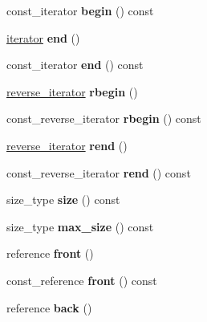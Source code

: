 \begin{DoxyCompactItemize}
\item 
\mbox{\label{classlist_ac8d43ad5c08a208998c872980c7d689d}} 
const\+\_\+iterator {\bfseries begin} () const
\item 
\mbox{\label{classlist_ac9f737cf32b7ee246d5a3af3a4762a2f}} 
\hyperlink{structiterator}{iterator} {\bfseries end} ()
\item 
\mbox{\label{classlist_a815c9d6fe25e78ee1381f70ecc1dc7cd}} 
const\+\_\+iterator {\bfseries end} () const
\item 
\mbox{\label{classlist_ad73fa8a409641c4f8e2d55340b643f85}} 
\hyperlink{classreverse__iterator}{reverse\+\_\+iterator} {\bfseries rbegin} ()
\item 
\mbox{\label{classlist_ab822d5b21ad59f49a9baa2e9834c5cfa}} 
const\+\_\+reverse\+\_\+iterator {\bfseries rbegin} () const
\item 
\mbox{\label{classlist_a2e5f98d6bfb90f56e3b36c1ed43f8a3b}} 
\hyperlink{classreverse__iterator}{reverse\+\_\+iterator} {\bfseries rend} ()
\item 
\mbox{\label{classlist_acbc05d64e00f25eef983c0d9d80d1ee7}} 
const\+\_\+reverse\+\_\+iterator {\bfseries rend} () const
\item 
\mbox{\label{classlist_a877231dc8a378d0480791a2e7b475950}} 
size\+\_\+type {\bfseries size} () const
\item 
\mbox{\label{classlist_ac23562cfa1fff0e097be9499f7454907}} 
size\+\_\+type {\bfseries max\+\_\+size} () const
\item 
\mbox{\label{classlist_ae17efa5f51e4cfbfa875347f237af9af}} 
reference {\bfseries front} ()
\item 
\mbox{\label{classlist_a18ffb45b1c4d292a21bf7b9c4066b087}} 
const\+\_\+reference {\bfseries front} () const
\item 
\mbox{\label{classlist_a0f81365b027e9f32e0a987c176f0ad3c}} 
reference {\bfseries back} ()
\item 

\end{DoxyCompactItemize}
